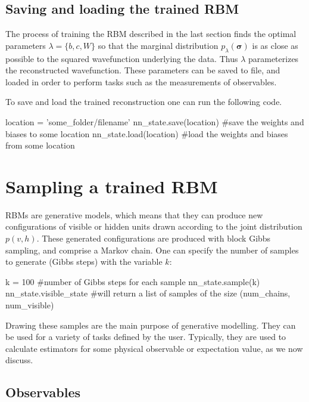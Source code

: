\documentclass[submission, Phys]{SciPost}
\begin{document}
\subsection{Saving and loading the trained RBM}

The process of training the RBM described in the last section finds the optimal parameters $\lambda = \{b,c,W\}$ so that 
the marginal distribution $p_{\lambda} ( \bm{\sigma})$ is as close as possible to the squared wavefunction underlying the data.
Thus $\lambda$ parameterizes the reconstructed wavefunction.  These parameters can be saved to file, and loaded in order to perform tasks such as the measurements of observables.

To save and load the trained reconstruction one can run the following code.

\begin{python}
location = 'some_folder/filename'
nn_state.save(location) #save the weights and biases to some location
nn_state.load(location) #load the weights and biases from some location
\end{python}


\section{Sampling a trained RBM}
\label{Sec:Sampling_a-Trained_RBM}

RBMs are generative models, which means that they can produce new configurations of visible or hidden units drawn according 
to the joint distribution $p(v,h)$.  These generated configurations are produced with block Gibbs sampling, and comprise a Markov chain.  One can specify the number of samples to generate (Gibbs steps) with the variable $k$:
\begin{python}
k = 100 #number of Gibbs steps for each sample
nn_state.sample(k)
nn_state.visible_state #will return a list of samples of the size (num_chains, num_visible)
\end{python}
Drawing these samples are the main purpose of generative modelling.  They can be used for a variety of tasks defined by the user.  Typically, they are used to calculate estimators for some physical observable or expectation value, as we now discuss.

\subsection{Observables}
\label{Sec:Observables}
\end{document}
